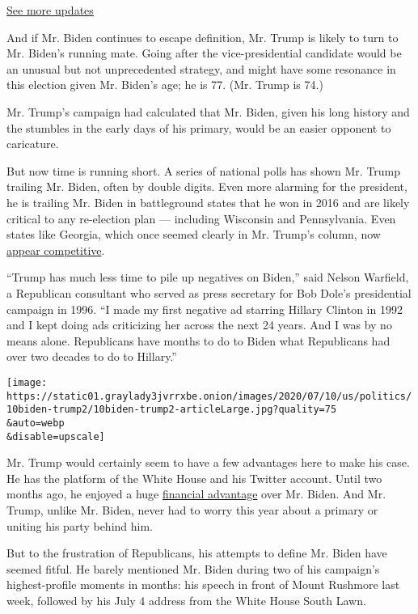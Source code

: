 \href{https://www.nytimes3xbfgragh.onion/2020/08/04/us/elections/primary-election-michigan-arizona-kansas.html?action=click\&pgtype=Article\&state=default\&region=MAIN_CONTENT_1\&context=storylines_live_updates}{See
more updates}

And if Mr. Biden continues to escape definition, Mr. Trump is likely to
turn to Mr. Biden's running mate. Going after the vice-presidential
candidate would be an unusual but not unprecedented strategy, and might
have some resonance in this election given Mr. Biden's age; he is 77.
(Mr. Trump is 74.)

Mr. Trump's campaign had calculated that Mr. Biden, given his long
history and the stumbles in the early days of his primary, would be an
easier opponent to caricature.

But now time is running short. A series of national polls has shown Mr.
Trump trailing Mr. Biden, often by double digits. Even more alarming for
the president, he is trailing Mr. Biden in battleground states that he
won in 2016 and are likely critical to any re-election plan ---
including Wisconsin and Pennsylvania. Even states like Georgia, which
once seemed clearly in Mr. Trump's column, now
\href{https://cookpolitical.com/analysis/national/national-politics/new-july-2020-electoral-college-ratings}{appear
competitive}.

``Trump has much less time to pile up negatives on Biden,'' said Nelson
Warfield, a Republican consultant who served as press secretary for Bob
Dole's presidential campaign in 1996. ``I made my first negative ad
starring Hillary Clinton in 1992 and I kept doing ads criticizing her
across the next 24 years. And I was by no means alone. Republicans have
months to do to Biden what Republicans had over two decades to do to
Hillary.''

\texttt{[image: https://static01.graylady3jvrrxbe.onion/images/2020/07/10/us/politics/10biden-trump2/10biden-trump2-articleLarge.jpg?quality=75\\\&auto=webp\\\&disable=upscale]}

Mr. Trump would certainly seem to have a few advantages here to make his
case. He has the platform of the White House and his Twitter account.
Until two months ago, he enjoyed a huge
\href{https://www.nytimes3xbfgragh.onion/2020/07/01/us/politics/trump-fundraising-2020.html}{financial
advantage} over Mr. Biden. And Mr. Trump, unlike Mr. Biden, never had to
worry this year about a primary or uniting his party behind him.

But to the frustration of Republicans, his attempts to define Mr. Biden
have seemed fitful. He barely mentioned Mr. Biden during two of his
campaign's highest-profile moments in months: his speech in front of
Mount Rushmore last week, followed by his July 4 address from the White
House South Lawn.

